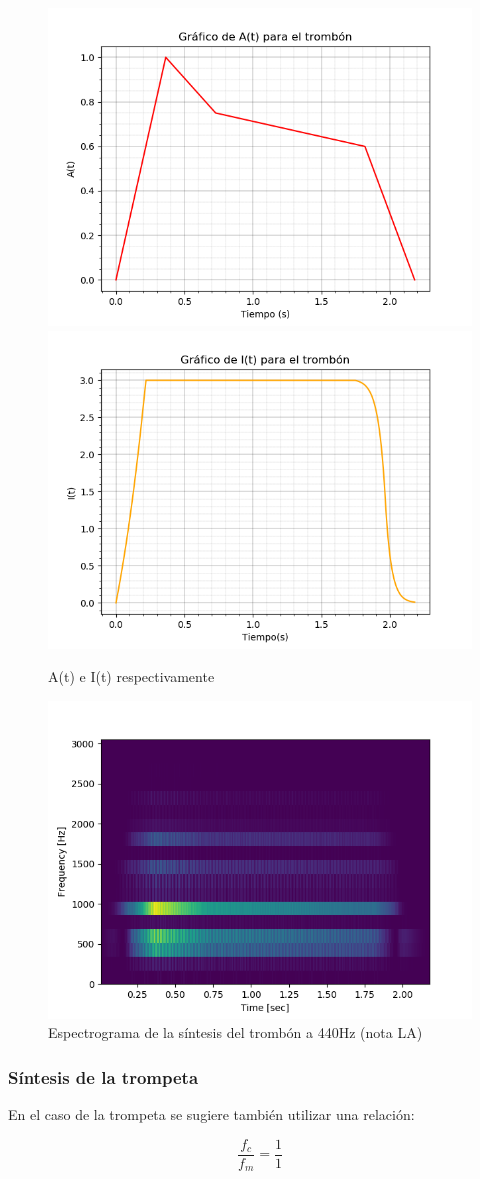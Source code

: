 \documentclass[assd_tp2_main.tex]{subfiles}
\begin{document}
\begin{figure}[H]
\centering
\includegraphics[width=0.4\linewidth]{graficos/EJ4/at_trombon.png}
\includegraphics[width=0.4\linewidth]{graficos/EJ4/it_trombon.png}
\caption{A(t) e I(t) respectivamente}
\label{fig:trombone_envelopes}
\end{figure}

\begin{figure}[H]
\centering
\includegraphics[width=0.4\linewidth]{graficos/EJ4/espectrograma_trombon.png}
\caption{Espectrograma de la síntesis del trombón a 440Hz (nota LA)}
\label{fig:trombone_440}
\end{figure}

\newpage

\subsubsection{S\'intesis de la trompeta}

En el caso de la trompeta se sugiere tambi\'en utilizar una relaci\'on:

\[
\frac{f_c}{f_m} = \frac{1}{1}
\]
\end{document}
